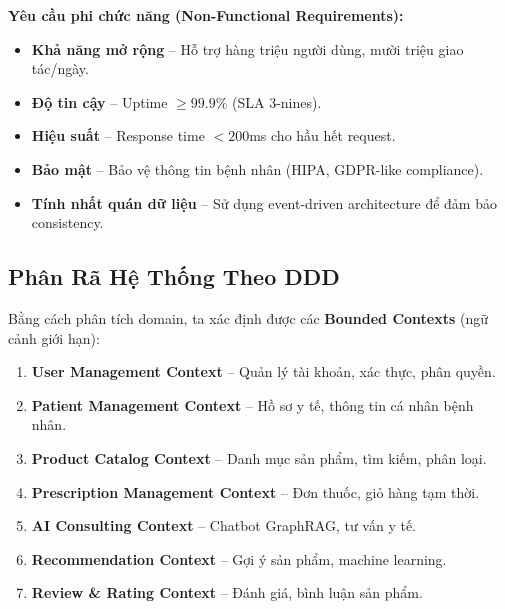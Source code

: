 \documentclass[12pt,a4paper]{article}
\begin{document}
\textbf{Yêu cầu phi chức năng (Non-Functional Requirements):}
\begin{itemize}
    \item \textbf{Khả năng mở rộng} – Hỗ trợ hàng triệu người dùng, mười triệu giao tác/ngày.
    
    \item \textbf{Độ tin cậy} – Uptime $\geq 99.9\%$ (SLA 3-nines).
    
    \item \textbf{Hiệu suất} – Response time $< 200$ms cho hầu hết request.
    
    \item \textbf{Bảo mật} – Bảo vệ thông tin bệnh nhân (HIPA, GDPR-like compliance).
    
    \item \textbf{Tính nhất quán dữ liệu} – Sử dụng event-driven architecture để đảm bảo consistency.
\end{itemize}

\subsection{Phân Rã Hệ Thống Theo DDD}

Bằng cách phân tích domain, ta xác định được các \textbf{Bounded Contexts} (ngữ cảnh giới hạn):

\begin{enumerate}
    \item \textbf{User Management Context} – Quản lý tài khoản, xác thực, phân quyền.
    
    \item \textbf{Patient Management Context} – Hồ sơ y tế, thông tin cá nhân bệnh nhân.
    
    \item \textbf{Product Catalog Context} – Danh mục sản phẩm, tìm kiếm, phân loại.
    
    \item \textbf{Prescription Management Context} – Đơn thuốc, giỏ hàng tạm thời.
    
    \item \textbf{AI Consulting Context} – Chatbot GraphRAG, tư vấn y tế.
    
    \item \textbf{Recommendation Context} – Gợi ý sản phẩm, machine learning.
    
    \item \textbf{Review \& Rating Context} – Đánh giá, bình luận sản phẩm.
\end{enumerate}
\end{document}
